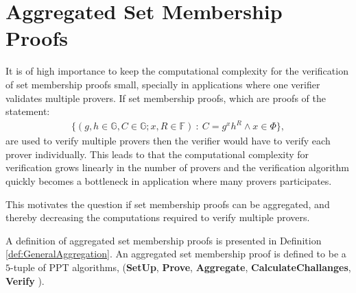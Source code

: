 \chapter{Aggregated Set Membership Proofs}
\label{ch:generalAgg}
It is of high importance to keep the computational complexity for the verification of set membership proofs small, 
 specially in applications where one verifier validates multiple provers. If set membership proofs, which are proofs of the statement:
\begin{align*}
    \{(g,h\in\mathds{G},C\in\mathds{G};x,R\in\mathds{F})\::\:C= g^x h^R \wedge x \in \Phi\},
\end{align*}
are used to verify multiple provers then the verifier would have to verify each prover individually. This leads to that the computational complexity for verification grows linearly in the number of provers and the verification algorithm quickly becomes a bottleneck in application where many provers participates. 

This motivates the question if set membership proofs can be aggregated, and thereby decreasing the computations required to verify multiple provers. 

A definition of aggregated set membership proofs is presented  in Definition \ref{def:GeneralAggregation}. An aggregated set membership proof is defined to be a  $5$-tuple of PPT algorithms,  (\textbf{SetUp}, \textbf{Prove}, \textbf{Aggregate}, \textbf{CalculateChallanges}, \textbf{Verify} ).


